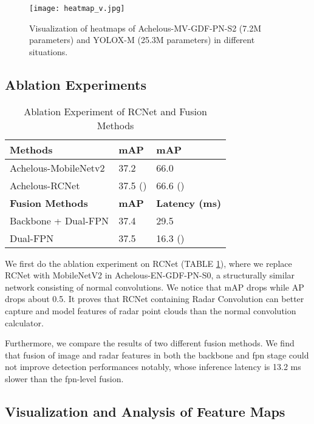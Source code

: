 \documentclass[letterpaper, 10 pt, conference]{ieeeconf}
\begin{document}
\begin{figure*}
    \centering
    \texttt{[image: heatmap\_v.jpg]}
    \caption{Visualization of heatmaps of Achelous-MV-GDF-PN-S2 (7.2M parameters) and YOLOX-M (25.3M parameters) in different situations.}
    \label{fig:heatmap_visual}
\end{figure*}

\subsection{Ablation Experiments}

\begin{table}
\caption{Ablation Experiment of RCNet and Fusion Methods}
\centering
\label{tab:rc_net_compare}
\begin{tabular}{l|ll}  
\toprule   
  \textbf{Methods} & \textbf{mAP} & \textbf{mAP}  \\
\midrule 
  Achelous-MobileNetv2 & 37.2  & 66.0  \\
  Achelous-RCNet & 37.5 () & 66.6 ()   \\
\midrule
  \textbf{Fusion Methods} & \textbf{mAP} & \textbf{Latency (ms)} \\
\midrule
  Backbone + Dual-FPN & 37.4  & 29.5 \\
  Dual-FPN & 37.5  & 16.3 () \\
\bottomrule  
\end{tabular}
\end{table}

We first do the ablation experiment on RCNet (TABLE \ref{tab:rc_net_compare}), where we replace RCNet with MobileNetV2 in Achelous-EN-GDF-PN-S0, a structurally similar network consisting of normal convolutions. We notice that mAP drops  while AP drops about 0.5. It proves that RCNet containing Radar Convolution can better capture and model features of radar point clouds than the normal convolution calculator.

Furthermore, we compare the results of two different fusion methods. We find that fusion of image and radar features in both the backbone and fpn stage could not improve detection performances notably, whose inference latency is 13.2 ms slower than the fpn-level fusion.



\subsection{Visualization and Analysis of Feature Maps}
\end{document}
